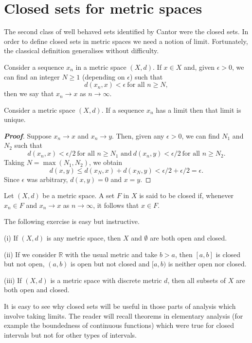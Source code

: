 \section{Closed sets for metric spaces} 
The second class of well behaved sets identified by Cantor
were the closed sets. In order to define closed
sets in metric spaces we need a notion of limit.
Fortunately, the classical definition generalises
without difficulty.
\begin{definition}\label{D;limit}
Consider a sequence $x_{n}$ in a
metric space $(X,d)$. If $x\in X$ and, given $\epsilon>0$,
we can find an integer $N\geq 1$ (depending on $\epsilon$)
such that
\[d(x_{n},x)<\epsilon\ \text{for all $n\geq N$},\]
then we say that $x_{n}\rightarrow x$ as $n\rightarrow\infty$.
\end{definition}


\begin{theorem}\label{T;limit unique} 
Consider a metric space $(X,d)$. If
a sequence $x_{n}$ has a limit then that limit is unique.
\end{theorem}

\begin{proof}[\bf Proof] Suppose $x_{n}\rightarrow x$ and $x_{n}\rightarrow y$.
Then, given any $\epsilon>0$, we can find $N_{1}$ and $N_{2}$ such that
\[
d(x_{n},x)<\epsilon/2\ \text{for all $n\geq N_{1}$ and}
\ d(x_{n},y)<\epsilon/2\ \text{for all $n\geq N_{2}$}.
\]
Taking $N=\max(N_{1},N_{2})$, we obtain
\[d(x,y)\leq d(x_{N},x)+d(x_{N},y)<\epsilon/2+\epsilon/2=\epsilon.\]
Since $\epsilon$ was arbitrary, $d(x,y)=0$ and $x=y$.
\end{proof}


\begin{definition}\label{D;metric closed set} 
Let $(X,d)$ be a metric space. A set $F$ in $X$
is said to be closed if, whenever $x_{n}\in F$ and
$x_{n}\rightarrow x$ as $n\rightarrow\infty$,
it follows that $x\in F$.
\end{definition}
The following exercise is easy but instructive.
\begin{exercise} (i) If $(X,d)$ is any metric space,
then $X$ and $\emptyset$ are both open and closed.

(ii) If we consider ${\mathbb R}$ with the usual metric
and take $b>a$, then $[a,b]$ is closed but not open,
$(a,b)$ is open but not closed and $[a,b)$ is neither
open nor closed.

(iii) If $(X,d)$ is 
a metric space with discrete metric $d$, then
all subsets of $X$ are both open and closed.
\end{exercise}
It is easy to see why closed sets will be useful in 
those parts of analysis which involve taking limits.
The reader will recall theorems in elementary analysis
(for example the boundedness of continuous functions)
which were true for closed intervals but not for
other types of intervals.

